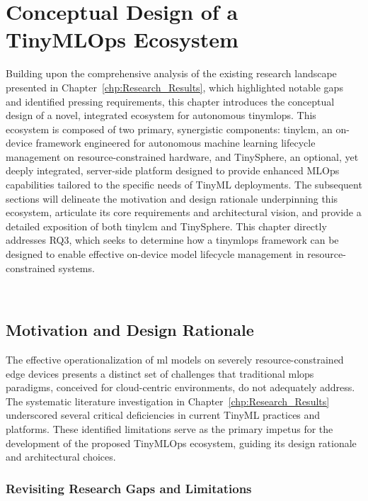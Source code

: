 
\chapter{Conceptual Design of a TinyMLOps Ecosystem}
\label{chp:Framework}

Building upon the comprehensive analysis of the existing research landscape presented in Chapter~\ref{chp:Research_Results}, which highlighted notable gaps and identified pressing requirements, this chapter introduces the conceptual design of a novel, integrated ecosystem for autonomous \gls{tinymlops}. This ecosystem is composed of two primary, synergistic components: \gls{tinylcm}, an on-device framework engineered for autonomous machine learning lifecycle management on resource-constrained hardware, and TinySphere, an optional, yet deeply integrated, server-side platform designed to provide enhanced MLOps capabilities tailored to the specific needs of TinyML deployments. The subsequent sections will delineate the motivation and design rationale underpinning this ecosystem, articulate its core requirements and architectural vision, and provide a detailed exposition of both \gls{tinylcm} and TinySphere. This chapter directly addresses RQ3, which seeks to determine how a \gls{tinymlops} framework can be designed to enable effective on-device model lifecycle management in resource-constrained systems.

~\\
\vfill
\minitoc
\clearpage


\section{Motivation and Design Rationale}
\label{sec:framework_motivation_rationale}

The effective operationalization of \gls{ml} models on severely resource-constrained edge devices presents a distinct set of challenges that traditional \gls{mlops} paradigms, conceived for cloud-centric environments, do not adequately address. The systematic literature investigation in Chapter~\ref{chp:Research_Results} underscored several critical deficiencies in current TinyML practices and platforms. These identified limitations serve as the primary impetus for the development of the proposed TinyMLOps ecosystem, guiding its design rationale and architectural choices.

\subsection{Revisiting Research Gaps and Limitations}
\label{ssec:framework_revisiting_gaps}


